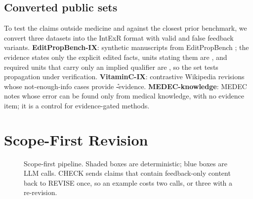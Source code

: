 \subsection{Converted public sets}
To test the claims outside medicine and against the closest prior benchmark, we convert three datasets into the IntExR format with valid and false feedback variants. \textbf{EditPropBench-IX}: synthetic manuscripts from EditPropBench \citep{kruthof2026editpropbench}; the evidence states only the explicit edited facts, units stating them are \D{}, and required units that carry only an implied qualifier are \Pp{}, so the set tests propagation under verification. \textbf{VitaminC-IX}: contrastive Wikipedia revisions \citep{schuster2021vitaminc} whose not-enough-info cases provide \U-evidence. \textbf{MEDEC-knowledge}: MEDEC notes whose error can be found only from medical knowledge, with no evidence item; it is a control for evidence-gated methods. 

\section{Scope-First Revision}
\label{sec:method}
\begin{figure}[t]
\centering
{}
\caption{Scope-first pipeline. Shaded boxes are deterministic; blue boxes are LLM calls. CHECK sends claims that contain feedback-only content back to REVISE once, so an example costs two calls, or three with a re-revision.}
\label{fig:pipeline}
\end{figure}

